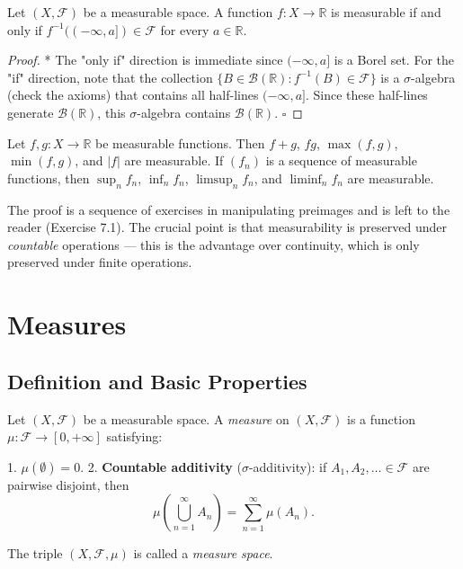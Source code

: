 \begin{proposition}\label{prop:7.7.}
Let $(X, \mathcal{F})$ be a measurable space. A function $f: X \to \mathbb{R}$ is measurable if and only if $f^{-1}((-\infty, a]) \in \mathcal{F}$ for every $a \in \mathbb{R}$.
\end{proposition}


\begin{proof}
* The "only if" direction is immediate since $(-\infty, a]$ is a Borel set. For the "if" direction, note that the collection $\{B \in \mathcal{B}(\mathbb{R}) : f^{-1}(B) \in \mathcal{F}\}$ is a $\sigma$-algebra (check the axioms) that contains all half-lines $(-\infty, a]$. Since these half-lines generate $\mathcal{B}(\mathbb{R})$, this $\sigma$-algebra contains $\mathcal{B}(\mathbb{R})$. $\square$

\end{proof}

\begin{proposition}\label{prop:7.8.}
Let $f, g: X \to \mathbb{R}$ be measurable functions. Then $f + g$, $fg$, $\max(f,g)$, $\min(f,g)$, and $|f|$ are measurable. If $(f_n)$ is a sequence of measurable functions, then $\sup_n f_n$, $\inf_n f_n$, $\limsup_n f_n$, and $\liminf_n f_n$ are measurable.

The proof is a sequence of exercises in manipulating preimages and is left to the reader (Exercise 7.1). The crucial point is that measurability is preserved under \textit{countable} operations --- this is the advantage over continuity, which is only preserved under finite operations.


\bigskip

\end{proposition}


\section{Measures}\label{sec:7.3}

\subsection{Definition and Basic Properties}\label{sec:7.3.1}

\begin{definition}\label{def:7.9.}
Let $(X, \mathcal{F})$ be a measurable space. A \textit{measure} on $(X, \mathcal{F})$ is a function $\mu: \mathcal{F} \to [0, +\infty]$ satisfying:

1. $\mu(\emptyset) = 0$.
2. \textbf{Countable additivity} ($\sigma$-additivity): if $A_1, A_2, \ldots \in \mathcal{F}$ are pairwise disjoint, then
\[
\mu\!\left(\bigcup_{n=1}^{\infty} A_n\right) = \sum_{n=1}^{\infty} \mu(A_n).
\]

The triple $(X, \mathcal{F}, \mu)$ is called a \textit{measure space}.
\end{definition}


